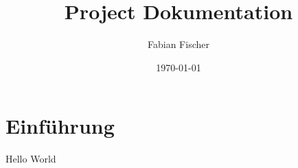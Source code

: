 \documentclass{article}
\title{Project Dokumentation}
\author{Fabian Fischer}
\date{\today}
\begin{document}
\maketitle

\section{Einführung}

Hello World
\end{document}
